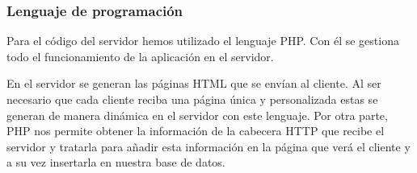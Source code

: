 \subsubsection{Lenguaje de programación}
Para el código del servidor hemos utilizado el lenguaje PHP. Con él se gestiona todo el funcionamiento de la aplicación en el servidor.\par
En el servidor se generan las páginas HTML que se envían al cliente. Al ser necesario que cada cliente reciba una página única y personalizada estas se generan de manera dinámica en el servidor con este lenguaje. Por otra parte, PHP nos permite obtener la información de la cabecera HTTP que recibe el servidor y tratarla para añadir esta información en la página que verá el cliente y a su vez insertarla en nuestra base de datos.\par
\newpage

